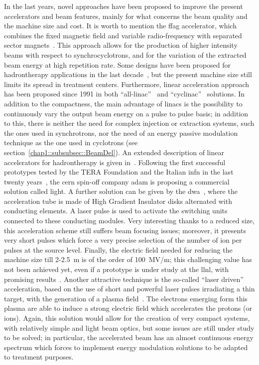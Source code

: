 In the last years, novel approaches have been proposed  to improve the present accelerators and beam features, mainly for what concerns the beam quality and the machine size and cost. It is worth to mention the \gls{ffag} accelerator, which combines the fixed magnetic field and variable radio-frequency with separated sector magnets~\parencite{Sheehy2016}. This approach allows for the production of higher intensity beams with respect to synchrocyclotrons, and for the variation of the extracted beam energy at high repetition rate. Some designs have been proposed for hadrontherapy applications in the last decade~\parencite{Antoine2009, Peach2010}, but the present machine size still limits its spread in treatment centers. 
Furthermore, linear acceleration approach has been proposed since 1991 in both \enquote{all-linac}~\parencite{Lennox1991, Hamm1991} and \enquote{cyclinac}~\parencite{Amaldi2009b} solutions. In addition to the compactness, the main advantage of linacs is the possibility to continuously vary the output beam energy on a pulse to pulse basis; in addition to this, there is neither the need for complex injection or extraction systems, such the ones used in synchrotrons, nor the need of an energy passive modulation technique as the one used in cyclotrons (see section~\ref{chap1::subsubsec::BeamDel}). An extended description of linear accelerators for hadrontherapy is given in~\cite{Amaldi2009a}. Following the first successful prototypes tested by the TERA Foundation and the Italian \gls{infn} in the last twenty years~\parencite{Amaldi2004, Ronsivalle2011}, the \gls{cern} spin-off company \gls{adam} is proposing a commercial solution called \gls{light}. A further solution can be given by the \gls{dwa}~\parencite{Caporaso2009}, where the acceleration tube is made of High Gradient Insulator disks alternated with conducting elements. A laser pulse is used to activate the switching units connected to these conducting modules. Very interesting thanks to a reduced size, this acceleration scheme still suffers beam focusing issues; moreover, it presents very short pulses which force a very precise selection of the number of ion per pulses at the source level. Finally, the electric field needed for reducing the machine size till 2-2.5~m is of the order of 100~MV/m; this challenging value has not been achieved yet, even if a prototype is under study at the \gls{llnl}, with promising results~\parencite{Hettler2013, Zografos2013}. Another attractive technique is the so-called \enquote{laser driven} acceleration, based on the use of short and powerful laser pulses irradiating a thin target, with the generation of a plasma field~\parencite{Tajima2009}. The electrons emerging form this plasma are able to induce a strong electric field which accelerates the protons (or ions). Again, this solution would allow for the creation of very compact systems, with relatively simple and light beam optics, but some issues are still under study to be solved; in particular, the accelerated beam has an almost continuous energy spectrum which forces to implement energy modulation solutions to be adapted to treatment purposes. 


